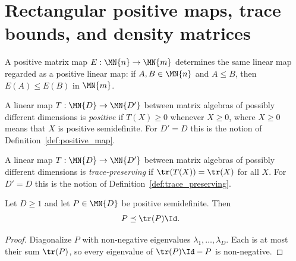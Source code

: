 \section{Rectangular positive maps, trace bounds, and density matrices}

\begin{definition}
    \label{def:positive_map_is_positive_linear_map}
    \leanok
    A positive matrix map $E : \MN{n} \to \MN{m}$ determines the same
    linear map regarded as a positive linear map: if
    $A,B\in\MN{n}$ and $A \le B$, then $E(A) \le E(B)$ in $\MN{m}$.
\end{definition}

\begin{definition}
    \label{def:positive_map_rectangular}
    A linear map $T : \MN{D} \to \MN{D'}$ between matrix algebras of
    possibly different dimensions is \emph{positive} if $T(X) \ge 0$
    whenever $X \ge 0$, where $X \ge 0$ means that $X$ is positive
    semidefinite. For $D' = D$ this is the notion of
    Definition~\ref{def:positive_map}.
\end{definition}

\begin{definition}
    \label{def:trace_preserving_rectangular}
    A linear map $T : \MN{D} \to \MN{D'}$ between matrix algebras of
    possibly different dimensions is \emph{trace-preserving} if
    $\tr(T(X)) = \tr(X)$ for all $X$. For $D' = D$ this is the notion of
    Definition~\ref{def:trace_preserving}.
\end{definition}

\begin{theorem}
    \label{thm:psd_le_trace_smul_one}
    \leanok
    Let $D\geq 1$ and let $P\in\MN{D}$ be positive semidefinite. Then
    \begin{align}
        P
         & \preceq \tr(P)\Id.
        \label{eq:channel_psd_trace_bound}
    \end{align}
\end{theorem}

\begin{proof}\leanok
    Diagonalize $P$ with non-negative eigenvalues
    $\lambda_1,\ldots,\lambda_D$. Each is at most their sum $\tr(P)$, so
    every eigenvalue of $\tr(P)\Id-P$ is non-negative.
\end{proof}


